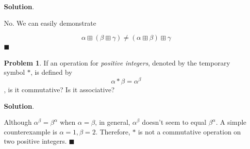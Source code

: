\documentclass[english,notitlepage,smartquotes]{hgbreport}
\theoremstyle{definition}
\theoremstyle{definition}
\newtheorem{problem}{Problem}
\theoremstyle{remark}
\theoremstyle{definition}
\theoremstyle{plain}
\renewcommand\qedsymbol{$\blacksquare$}
\theoremstyle{definition}
\begin{document}
\textbf{Solution}.

No. We can easily demonstrate 

$$
\alpha\boxplus(\beta\boxplus\gamma)\ne(\alpha\boxplus\beta)\boxplus\gamma
$$
\qedsymbol

\begin{problem}
\label{pr:atob}
If an operation for \emph{positive integers}, denoted by the temporary symbol $*$, is defined by
$$
\alpha*\beta=\alpha^\beta
$$
, is it commutative? Is it associative?
\end{problem}

\textbf{Solution}.

Although $\alpha^\beta=\beta^\alpha$ when $\alpha=\beta$, in general, $\alpha^{\beta}$ doesn't seem to equal $\beta^\alpha$. A simple counterexample is $\alpha=1,\beta=2$. Therefore, $*$ is not a commutative operation on two positive integers.
\qedsymbol
\end{document}
